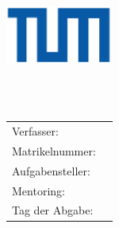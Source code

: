 \begin{titlepage}
	\centering
	
	\includegraphics[width=35mm]{logos/tum}
	
	\vspace{5mm}
	{\huge\MakeUppercase{\getUniversity{}}}\\
	
	\vspace{5mm}
	{\large\MakeUppercase{\getGroup{}}}\\
	
	\vspace{15mm}
	{\large \getDoctype{}}
	
	\vspace{10mm}
	{\huge\bfseries \getTitleGer{}}
	
	\vspace{15mm}
	\begin{tabular}{l l}
		Verfasser: & \getAuthor{} \\
		Matrikelnummer: & \getMat{}  \\
		Aufgabensteller: & \getSupervisor{} \\
		Mentoring: & \getAdvisor{} \\
		Tag der Abgabe: & \getSubmissionDate{} \\
	\end{tabular}
	
\end{titlepage}
